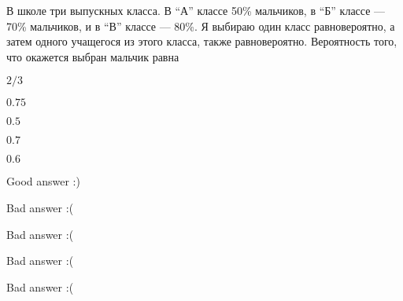 
\begin{question}
В школе три выпускных класса. В ``А'' классе 50\% мальчиков, в ``Б''
классе — 70\% мальчиков, и в ``В'' классе — 80\%. Я выбираю один
класс равновероятно, а затем одного учащегося из этого класса, также
равновероятно. Вероятность того, что окажется выбран мальчик равна
\begin{answerlist}
  \item \(2/3\)
  \item \(0.75\)
  \item \(0.5\)
  \item \(0.7\)
  \item \(0.6\)
\end{answerlist}
\end{question}

\begin{solution}
\begin{answerlist}
  \item Good answer :)
  \item Bad answer :(
  \item Bad answer :(
  \item Bad answer :(
  \item Bad answer :(
\end{answerlist}
\end{solution}


